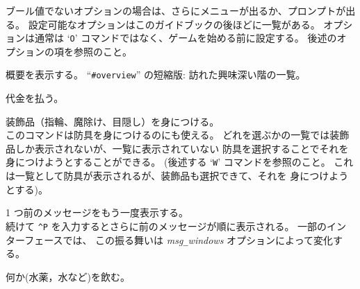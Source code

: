 ブール値でないオプションの場合は、さらにメニューが出るか、プロンプトが出る。
設定可能なオプションはこのガイドブックの後ほどに一覧がある。
オプションは通常は `{\tt O}' コマンドではなく、ゲームを始める前に設定する。
後述のオプションの項を参照のこと。
\item[\tb{\^{}O}]
概要を表示する。
``{\tt \#overview}'' の短縮版:
訪れた興味深い階の一覧。\\
\item[\tb{p}]
代金を払う。
\item[\tb{P}]
装飾品（指輪、魔除け、目隠し）を身につける。\\
このコマンドは防具を身につけるのにも使える。
どれを選ぶかの一覧では装飾品しか表示されないが、一覧に表示されていない
防具を選択することでそれを身につけようとすることができる。
(後述する `{\tt W}' コマンドを参照のこと。
これは一覧として防具が表示されるが、装飾品も選択できて、それを
身につけようとする)。
\item[\tb{\^{}P}]
1 つ前のメッセージをもう一度表示する。\\
続けて {\tt \^{}P} を入力するとさらに前のメッセージが順に表示される。
一部のインターフェースでは、
この振る舞いは {\it msg\verb+_+windows\/} オプションによって変化する。
\item[\tb{q}]
何か(水薬，水など)を飲む。
